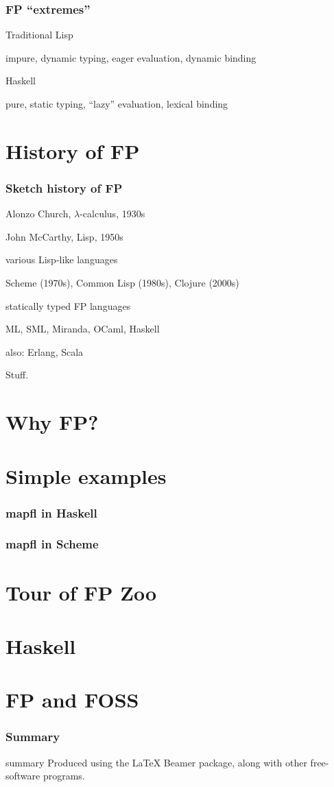 \begin{frame}
\frametitle{FP ``extremes''}
\bi
\item Traditional Lisp
\bi
\item impure, dynamic typing, eager evaluation, dynamic binding
\ei
\item Haskell
\bi
\item pure, static typing, ``lazy'' evaluation, lexical binding
\ei
\ei
\end{frame}

\section{History of FP}

\begin{frame}
\frametitle{Sketch history of FP}
\bi
\item Alonzo Church, $\lambda$-calculus, 1930s
\item John McCarthy, Lisp, 1950s
\item various Lisp-like languages
\bi
\item Scheme (1970s), Common Lisp (1980s), Clojure (2000s)
\ei
\item statically typed FP languages
\bi
\item ML, SML, Miranda, OCaml, Haskell
\ei
\item also: Erlang, Scala
\ei
\begin{annotation}
Stuff.
\end{annotation}
\end{frame}

\section{Why FP?}

\section{Simple examples}

\begin{frame}
\frametitle{mapfl in Haskell}

\end{frame}

\begin{frame}
\frametitle{mapfl in Scheme}

\end{frame}

\section{Tour of FP Zoo}

\section{Haskell}

\section{FP and FOSS}

\begin{frame}
\frametitle{Summary}
\bi
\item summary
\ei
\medskip
{\scriptsize Produced using the {\LaTeX} Beamer package, along
  with other free-software programs.}
\end{frame}


